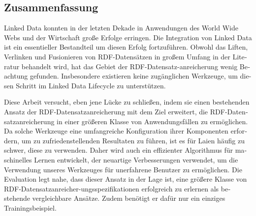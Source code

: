 \begin{otherlanguage}{ngerman}
\chapter*{Zusammenfassung}
Linked Data konnten in der letzten Dekade in Anwendungen des World Wide Webs und der Wirtschaft große Erfolge erringen.
Die Integration von Linked Data ist ein essentieller Bestandteil um diesen Erfolg fortzuführen.
Obwohl das Liften, Verlinken und Fusionieren von RDF-Datensätzen in großem Umfang in der Literatur behandelt wird, hat das Gebiet der RDF-Datensatz-anreicherung wenig Beachtung gefunden.
Insbesondere existieren keine zugänglichen Werkzeuge, um diesen Schritt im Linked Data Lifecycle zu unterstützen.

Diese Arbeit versucht, eben jene Lücke zu schließen, indem sie einen bestehenden Ansatz der RDF-Datensatzanreicherung mit dem Ziel erweitert, die RDF-Datensatzanreicherung in einer größeren Klasse von Anwendungsfällen zu ermöglichen.
Da solche Werkzeuge eine umfangreiche Konfiguration ihrer Komponenten erfordern, um zu zufriedenstellenden Resultaten zu führen, ist es für Laien häufig zu schwer, diese zu verwenden.
Daher wird auch ein effizienter Algorithmus für maschinelles Lernen entwickelt, der neuartige Verbesserungen verwendet, um die Verwendung unseres Werkzeuges für unerfahrene Benutzer zu ermöglichen.
Die Evaluation legt nahe, dass dieser Ansatz in der Lage ist, eine größere Klasse von RDF-Datensatzanreicher-ungsspezifikationen erfolgreich zu erlernen als bestehende vergleichbare Ansätze.
Zudem benötigt er dafür nur ein einziges Trainingsbeispiel.
\end{otherlanguage}

\endgroup

\vfill
